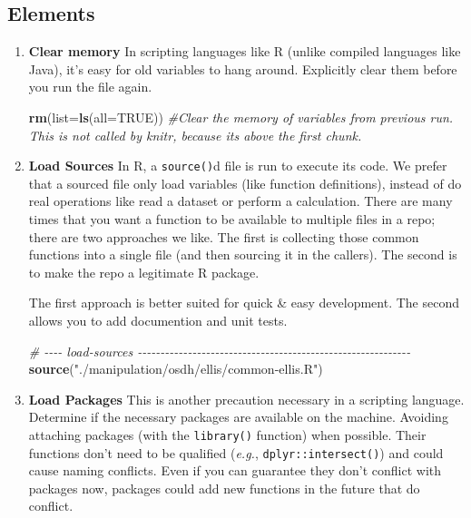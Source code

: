 \documentclass[
]{book}
\newenvironment{Shaded}{\begin{snugshade}}{\end{snugshade}}
\newcommand{\CommentTok}[1]{\textcolor[rgb]{0.56,0.35,0.01}{\textit{#1}}}
\newcommand{\DataTypeTok}[1]{\textcolor[rgb]{0.13,0.29,0.53}{#1}}
\newcommand{\KeywordTok}[1]{\textcolor[rgb]{0.13,0.29,0.53}{\textbf{#1}}}
\newcommand{\NormalTok}[1]{#1}
\newcommand{\OtherTok}[1]{\textcolor[rgb]{0.56,0.35,0.01}{#1}}
\newcommand{\StringTok}[1]{\textcolor[rgb]{0.31,0.60,0.02}{#1}}
\begin{document}
\hypertarget{elements}{%
\subsection{Elements}\label{elements}}

\begin{enumerate}
\def\labelenumi{\arabic{enumi}.}
\item
  \textbf{Clear memory} In scripting languages like R (unlike compiled languages like Java), it's easy for old variables to hang around. Explicitly clear them before you run the file again.

\begin{Shaded}
\begin{Highlighting}[]
\KeywordTok{rm}\NormalTok{(}\DataTypeTok{list=}\KeywordTok{ls}\NormalTok{(}\DataTypeTok{all=}\OtherTok{TRUE}\NormalTok{)) }\CommentTok{\#Clear the memory of variables from previous run. This is not called by knitr, because it\textquotesingle{}s above the first chunk.}
\end{Highlighting}
\end{Shaded}
\item
  \textbf{Load Sources} In R, a \texttt{source()}d file is run to execute its code. We prefer that a sourced file only load variables (like function definitions), instead of do real operations like read a dataset or perform a calculation. There are many times that you want a function to be available to multiple files in a repo; there are two approaches we like. The first is collecting those common functions into a single file (and then sourcing it in the callers). The second is to make the repo a legitimate R package.

  The first approach is better suited for quick \& easy development. The second allows you to add documention and unit tests.

\begin{Shaded}
\begin{Highlighting}[]
\CommentTok{\# {-}{-}{-}{-} load{-}sources {-}{-}{-}{-}{-}{-}{-}{-}{-}{-}{-}{-}{-}{-}{-}{-}{-}{-}{-}{-}{-}{-}{-}{-}{-}{-}{-}{-}{-}{-}{-}{-}{-}{-}{-}{-}{-}{-}{-}{-}{-}{-}{-}{-}{-}{-}{-}{-}{-}{-}{-}{-}{-}{-}{-}{-}{-}{-}{-}{-}}
\KeywordTok{source}\NormalTok{(}\StringTok{"./manipulation/osdh/ellis/common{-}ellis.R"}\NormalTok{)}
\end{Highlighting}
\end{Shaded}
\item
  \textbf{Load Packages} This is another precaution necessary in a scripting language. Determine if the necessary packages are available on the machine. Avoiding attaching packages (with the \texttt{library()} function) when possible. Their functions don't need to be qualified (\emph{e.g.}, \texttt{dplyr::intersect()}) and could cause naming conflicts. Even if you can guarantee they don't conflict with packages now, packages could add new functions in the future that do conflict.


\end{enumerate}
\end{document}
